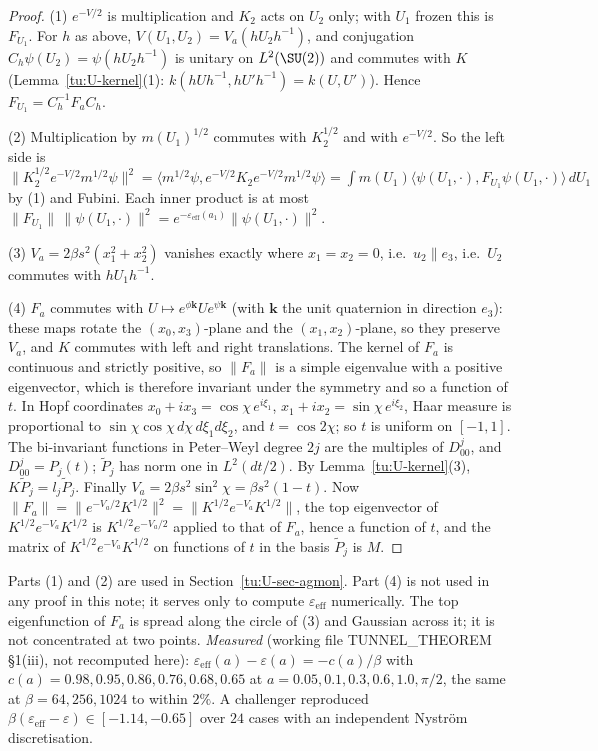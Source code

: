 \begin{proof}
(1) $e^{-V/2}$ is multiplication and $K_2$ acts on $U_2$ only; with $U_1$ frozen this is $F_{U_1}$. For
$h$ as above, $V(U_1,U_2)=V_{a}(hU_2h^{-1})$, and conjugation $C_h\psi(U_2)=\psi(hU_2h^{-1})$ is unitary on
$L^2(\SU(2))$ and commutes with $K$ (Lemma~\ref{tu:U-kernel}(1): $k(hUh^{-1},hU'h^{-1})=k(U,U')$). Hence
$F_{U_1}=C_h^{-1}F_aC_h$.

(2) Multiplication by $m(U_1)^{1/2}$ commutes with $K_2^{1/2}$ and with $e^{-V/2}$. So the left side is
$\|K_2^{1/2}e^{-V/2}m^{1/2}\psi\|^2=\langle m^{1/2}\psi,e^{-V/2}K_2e^{-V/2}m^{1/2}\psi\rangle
=\int m(U_1)\langle\psi(U_1,\cdot),F_{U_1}\psi(U_1,\cdot)\rangle\,dU_1$ by (1) and Fubini. Each inner product is at
most $\|F_{U_1}\|\,\|\psi(U_1,\cdot)\|^2=e^{-\varepsilon_{\mathrm{eff}}(a_1)}\|\psi(U_1,\cdot)\|^2$.

(3) $V_a=2\beta s^2(x_1^2+x_2^2)$ vanishes exactly where $x_1=x_2=0$, i.e.\ $u_2\parallel e_3$, i.e.\ $U_2$
commutes with $hU_1h^{-1}$.

(4) $F_a$ commutes with $U\mapsto e^{\phi\mathbf{k}}Ue^{\psi\mathbf{k}}$ (with $\mathbf{k}$ the unit quaternion
in direction $e_3$): these maps rotate the $(x_0,x_3)$-plane and the $(x_1,x_2)$-plane, so they preserve
$V_a$, and $K$ commutes with left and right translations. The kernel of $F_a$ is continuous and strictly
positive, so $\|F_a\|$ is a simple eigenvalue with a positive eigenvector, which is therefore invariant
under the symmetry and so a function of $t$. In Hopf coordinates $x_0+ix_3=\cos\chi\,e^{i\xi_1}$,
$x_1+ix_2=\sin\chi\,e^{i\xi_2}$, Haar measure is proportional to $\sin\chi\cos\chi\,d\chi\,d\xi_1d\xi_2$, and
$t=\cos2\chi$; so $t$ is uniform on $[-1,1]$. The bi-invariant functions in Peter--Weyl degree $2j$ are the
multiples of $D^j_{00}$, and $D^j_{00}=P_j(t)$; $\tilde P_j$ has norm one in $L^2(dt/2)$. By
Lemma~\ref{tu:U-kernel}(3), $K\tilde P_j=l_j\tilde P_j$. Finally $V_a=2\beta s^2\sin^2\chi=\beta s^2(1-t)$. Now
$\|F_a\|=\|e^{-V_a/2}K^{1/2}\|^2=\|K^{1/2}e^{-V_a}K^{1/2}\|$, the top eigenvector of $K^{1/2}e^{-V_a}K^{1/2}$ is
$K^{1/2}e^{-V_a/2}$ applied to that of $F_a$, hence a function of $t$, and the matrix of
$K^{1/2}e^{-V_a}K^{1/2}$ on functions of $t$ in the basis $\tilde P_j$ is $M$.
\end{proof}

\begin{remark}\label{tu:U-R-rem}
Parts (1) and (2) are used in Section~\ref{tu:U-sec-agmon}. Part (4) is not used in any proof in this
note; it serves only to compute $\varepsilon_{\mathrm{eff}}$ numerically. The top eigenfunction of $F_a$ is
spread along the circle of (3) and Gaussian across it; it is not concentrated at two points.
\emph{Measured} (working file TUNNEL\_THEOREM \S1(iii), not recomputed here):
$\varepsilon_{\mathrm{eff}}(a)-\varepsilon(a)=-c(a)/\beta$ with $c(a)=0.98,0.95,0.86,0.76,0.68,0.65$ at
$a=0.05,0.1,0.3,0.6,1.0,\pi/2$, the same at $\beta=64,256,1024$ to within $2\%$. A challenger
reproduced $\beta(\varepsilon_{\mathrm{eff}}-\varepsilon)\in[-1.14,-0.65]$ over $24$ cases with an independent
Nystr\"om discretisation.
\end{remark}

